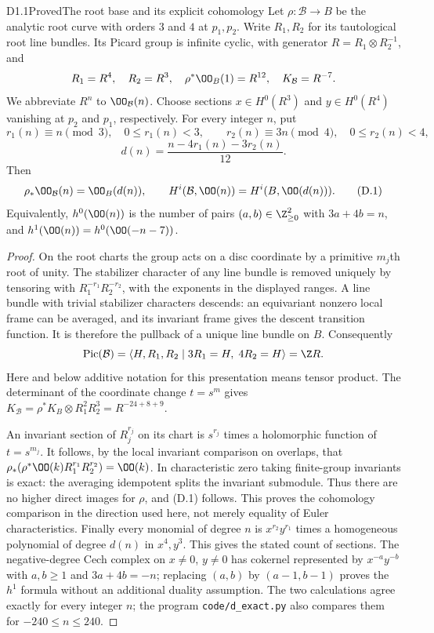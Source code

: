 \begin{claim}{D1.1}{Proved}{The root base and its explicit cohomology}
Let $\rho:\mathcal B\to B$ be the analytic root curve with orders $3$ and
$4$ at $p_1,p_2$. Write $R_1,R_2$ for its tautological root line bundles.
Its Picard group is infinite cyclic, with generator
$R=R_1\otimes R_2^{-1}$, and
\[
 R_1=R^4,\quad R_2=R^3,\quad \rho^*\OO_B(1)=R^{12},
 \quad K_{\mathcal B}=R^{-7}.
\]
We abbreviate $R^n$ to $\OO_{\mathcal B}(n)$. Choose sections
$x\in H^0(R^3)$ and $y\in H^0(R^4)$ vanishing at $p_2$ and $p_1$,
respectively. For every integer $n$, put
\[
 r_1(n)\equiv n\pmod3,\quad 0\le r_1(n)<3,
 \qquad r_2(n)\equiv3n\pmod4,\quad0\le r_2(n)<4,
\]
\[
 d(n)=\frac{n-4r_1(n)-3r_2(n)}{12}.
\]
Then
\[
 \rho_*\OO_{\mathcal B}(n)=\OO_B(d(n)),\qquad
 H^i(\mathcal B,\OO(n))=H^i(B,\OO(d(n))).                 \tag{D.1}
\]
Equivalently, $h^0(\OO(n))$ is the number of pairs
$(a,b)\in\Z_{\ge0}^2$ with $3a+4b=n$, and
$h^1(\OO(n))=h^0(\OO(-n-7))$.
\end{claim}
\begin{proof}
On the root charts the group acts on a disc coordinate by a primitive
$m_j$th root of unity. The stabilizer character of any line bundle is
removed uniquely by tensoring with $R_1^{-r_1}R_2^{-r_2}$, with the
exponents in the displayed ranges. A line bundle with trivial stabilizer
characters descends: an equivariant nonzero local frame can be averaged,
and its invariant frame gives the descent transition function. It is
therefore the pullback of a unique line bundle on $B$. Consequently
\[
 \operatorname{Pic}(\mathcal B)=
 \langle H,R_1,R_2\mid 3R_1=H,\;4R_2=H\rangle=\Z R.
\]
Here and below additive notation for this presentation means tensor
product. The determinant of the coordinate change $t=s^m$ gives
$K_{\mathcal B}=\rho^*K_B\otimes R_1^2R_2^3=R^{-24+8+9}$.

An invariant section of $R_j^{r_j}$ on its chart is $s^{r_j}$ times a
holomorphic function of $t=s^{m_j}$. It follows, by the local invariant
comparison on overlaps, that
$\rho_*(\rho^*\OO(k)R_1^{r_1}R_2^{r_2})=\OO(k)$.
In characteristic zero taking finite-group invariants is exact: the
averaging idempotent splits the invariant submodule. Thus there are no
higher direct images for $\rho$, and (D.1) follows. This proves the
cohomology comparison in the direction used here, not merely equality
of Euler characteristics. Finally every monomial of degree $n$ is
$x^{r_2}y^{r_1}$ times a homogeneous polynomial of degree $d(n)$ in
$x^4,y^3$. This gives the stated count of sections. The negative-degree
Cech complex on $x\ne0$, $y\ne0$ has cokernel represented by
$x^{-a}y^{-b}$ with $a,b\ge1$ and $3a+4b=-n$; replacing $(a,b)$ by
$(a-1,b-1)$ proves the $h^1$ formula without an additional duality
assumption. The two calculations agree exactly for every integer $n$;
the program \texttt{code/d\_exact.py} also compares them for
$-240\le n\le240$.
\end{proof}
